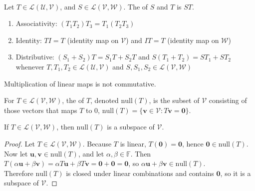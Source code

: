 \begin{remark} \\
Let $T \in \mathcal{L}(\mathcal{U}, \mathcal{V})$, and $S \in \mathcal{L}(\mathcal{V}, \mathcal{W})$. The  of $S$ and $T$ is $ST$.
\begin{enumerate}[label=\roman*.]
\setlength{\itemsep}{0pt}
\item Associativity: $(T_1 T_2)T_3 = T_1 (T_2 T_3)$
\item Identity: $TI = T$ (identity map on $\mathcal{V}$) and $IT = T$ (identity map on $\mathcal{W}$)
\item Distributive: $(S_1 + S_2)T = S_1 T + S_2 T$ and $S(T_1 + T_2) = ST_1 + ST_2$ whenever $T, T_1, T_2 \in \mathcal{L}(\mathcal{U}, \mathcal{V})$ and $S, S_1, S_2 \in \mathcal{L}(\mathcal{V}, \mathcal{W})$
\end{enumerate}
Multiplication of linear maps is not commutative.
\end{remark}

\begin{definition} For $T \in \mathcal{L}(\mathcal{V}, \mathcal{W})$, the  of $T$, denoted $\text{null}(T)$, is the subset of $\mathcal{V}$ consisting of those vectors that maps $T$ to $0$, $\text{null}(T) = \{ \mathbf{v} \in \mathcal{V}: T \mathbf{v} = \mathbf{0} \}$.
\end{definition}

\begin{proposition} \label{prop:nullspaceissubspace} If $T \in \mathcal{L}(\mathcal{V}, \mathcal{W})$, then $\text{null}(T)$ is a subspace of $\mathcal{V}$.
\begin{proof} Let $T \in \mathcal{L}(\mathcal{V}, \mathcal{W})$. Because $T$ is linear, $T(\mathbf{0}) = \mathbf{0}$, hence $\mathbf{0} \in \text{null}(T)$.\\
Now let $\mathbf{u}, \mathbf{v} \in \text{null}(T)$, and let $\alpha, \beta \in \mathbb{F}$. Then $T(\alpha \mathbf{u} + \beta \mathbf{v}) = \alpha T\mathbf{u} + \beta T\mathbf{v} = \mathbf{0} + \mathbf{0} = \mathbf{0}$, so $\alpha \mathbf{u} + \beta \mathbf{v} \in \text{null}(T)$.\\
Therefore $\text{null}(T)$ is closed under linear combinations and contains $\mathbf{0}$, so it is a subspace of $\mathcal{V}$.
\end{proof}
\end{proposition}

